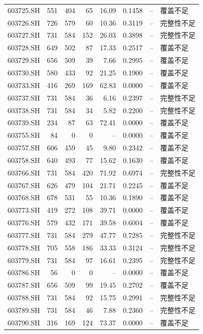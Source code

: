 \documentclass[10pt,a4paper]{article}
\begin{document}
\begin{longtable}{lrrr r r r l}
603725.SH & 551 & 404 & 65 & 16.09 & 0.1458 & -- & 覆盖不足\\
603726.SH & 726 & 579 & 60 & 10.36 & 0.3119 & -- & 完整性不足\\
603727.SH & 731 & 584 & 152 & 26.03 & 0.3898 & -- & 完整性不足\\
603728.SH & 649 & 502 & 87 & 17.33 & 0.2517 & -- & 覆盖不足\\
603729.SH & 656 & 509 & 39 & 7.66 & 0.2995 & -- & 覆盖不足\\
603730.SH & 580 & 433 & 92 & 21.25 & 0.1900 & -- & 覆盖不足\\
603733.SH & 416 & 269 & 169 & 62.83 & 0.0000 & -- & 覆盖不足\\
603737.SH & 731 & 584 & 36 & 6.16 & 0.2397 & -- & 完整性不足\\
603738.SH & 731 & 584 & 34 & 5.82 & 0.2200 & -- & 完整性不足\\
603739.SH & 234 & 87 & 63 & 72.41 & 0.0000 & -- & 覆盖不足\\
603755.SH & 84 & 0 & 0 & -- & 0.0000 & -- & 覆盖不足\\
603757.SH & 606 & 459 & 45 & 9.80 & 0.2342 & -- & 覆盖不足\\
603758.SH & 640 & 493 & 77 & 15.62 & 0.1630 & -- & 覆盖不足\\
603766.SH & 731 & 584 & 420 & 71.92 & 0.6974 & -- & 完整性不足\\
603767.SH & 626 & 479 & 104 & 21.71 & 0.2245 & -- & 覆盖不足\\
603768.SH & 678 & 531 & 55 & 10.36 & 0.1890 & -- & 覆盖不足\\
603773.SH & 419 & 272 & 108 & 39.71 & 0.0000 & -- & 覆盖不足\\
603776.SH & 579 & 432 & 171 & 39.58 & 0.6004 & -- & 覆盖不足\\
603777.SH & 731 & 584 & 279 & 47.77 & 0.7285 & -- & 完整性不足\\
603778.SH & 705 & 558 & 186 & 33.33 & 0.3124 & -- & 完整性不足\\
603779.SH & 731 & 584 & 97 & 16.61 & 0.2395 & -- & 完整性不足\\
603786.SH & 56 & 0 & 0 & -- & 0.0000 & -- & 覆盖不足\\
603787.SH & 656 & 509 & 99 & 19.45 & 0.2702 & -- & 覆盖不足\\
603788.SH & 731 & 584 & 92 & 15.75 & 0.2991 & -- & 完整性不足\\
603789.SH & 731 & 584 & 46 & 7.88 & 0.2360 & -- & 完整性不足\\
603790.SH & 316 & 169 & 124 & 73.37 & 0.0000 & -- & 覆盖不足\\

\end{longtable}
\end{document}
